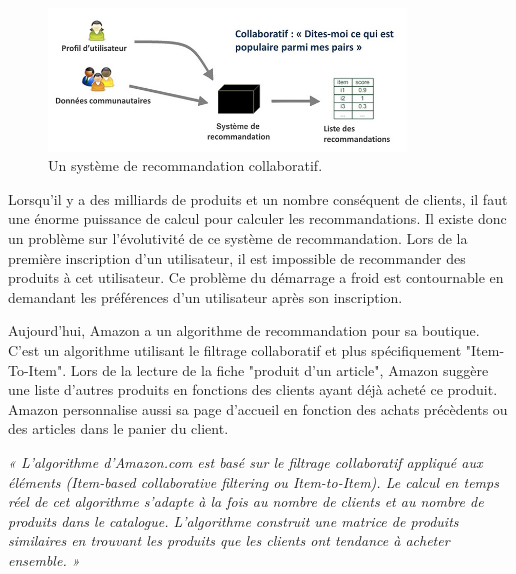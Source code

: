 \vspace{5mm}

\begin{figure}[htp]
  \centering
  \includegraphics[width=95mm]{./src_img/rs-collaboratif}
  \caption{Un système de recommandation collaboratif\supercite{RSIntro}.}
  \label{fig:duo}
\end{figure}

\vspace{5mm}


Lorsqu'il y a des milliards de produits et un nombre conséquent de clients, il faut une énorme puissance de calcul pour calculer les recommandations. Il existe donc un problème sur l'évolutivité de ce système de recommandation. Lors de la première inscription d'un utilisateur, il est impossible de recommander des produits à cet utilisateur. Ce problème du démarrage a froid est contournable en demandant les préférences d'un utilisateur après son inscription. 

\vspace{5mm}

Aujourd'hui, Amazon a un algorithme de recommandation pour sa boutique. C'est un algorithme utilisant le filtrage collaboratif et plus spécifiquement "Item-To-Item". Lors de la lecture de la fiche "produit d'un article", Amazon suggère une liste d'autres produits en fonctions des clients ayant déjà acheté ce produit. Amazon personnalise aussi sa page d'accueil en fonction des achats précèdents ou des articles dans le panier du client. 

\vspace{5mm} 

\textit{« L’algorithme d’Amazon.com est basé sur le filtrage collaboratif appliqué aux éléments (Item-based collaborative filtering ou Item-to-Item). Le calcul en temps réel de cet algorithme s’adapte à la fois au nombre de clients et au nombre de produits dans le catalogue. L’algorithme construit une matrice de produits similaires en trouvant les produits que les clients ont tendance à acheter ensemble. »}\supercite{elsaNegre}

\vspace{5mm}

